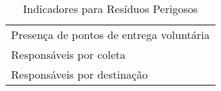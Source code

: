 \begin{table}[h!]
  \centering
  \caption{Indicadores para Resíduos Perigosos}
    \begin{tabular}{|p{25em}|}
    \rowcolor[rgb]{ .984,  .831,  .706} \multicolumn{1}{P{25em}}{RESÍDUOS PERIGOSOS} \\
    \midrule
    Presença de pontos de entrega voluntária \\
    \midrule
    Responsáveis por coleta \\
    \midrule
    Responsáveis por destinação \\
    \bottomrule
    \end{tabular}%
  \label{tab:ind_rp}%
\end{table}%
